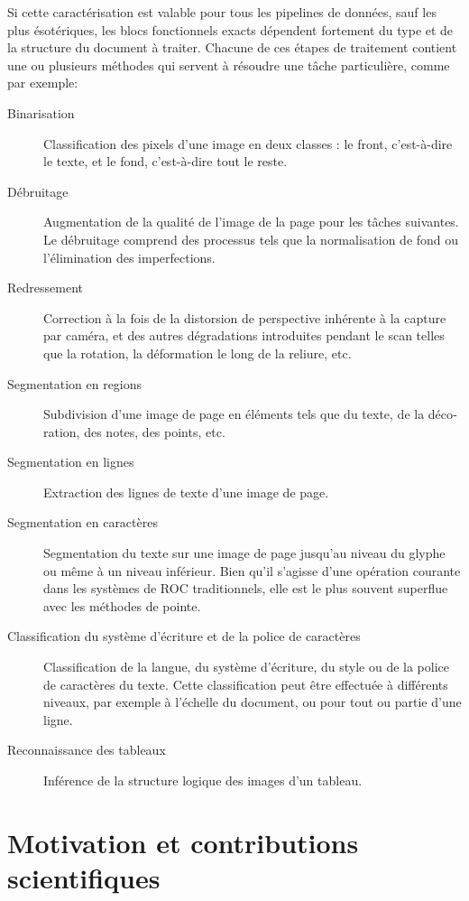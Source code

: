\begin{french}
Si cette caractérisation est valable pour tous les pipelines de données, sauf
les plus ésotériques, les blocs fonctionnels exacts dépendent fortement du type
et de la structure du document à traiter. Chacune de ces étapes de traitement
contient une ou plusieurs méthodes qui servent à résoudre une tâche
particulière, comme par exemple:

\begin{description}
\item [Binarisation] Classification des pixels d'une image en deux classes :
le front, c'est-à-dire le texte, et le fond, c'est-à-dire tout le
reste.
\item [Débruitage] Augmentation de la qualité de l'image de la page pour les tâches
	suivantes. Le débruitage comprend des processus tels que la
		normalisation de fond ou l'élimination des imperfections.
\item [Redressement] Correction à la fois de la distorsion de perspective
	inhérente à la capture par caméra, et des autres dégradations introduites pendant le scan telles que la
rotation, la déformation le long de la reliure, etc.
\item [Segmentation en regions]  Subdivision d'une image de page en éléments tels que du texte, de la décoration, des notes, des points, etc.
\item [Segmentation en lignes] Extraction des lignes de texte d'une image de page.
\item [Segmentation en caractères] Segmentation du texte sur une image de page
	jusqu'au niveau du glyphe ou même à un niveau inférieur. Bien qu'il
		s'agisse d'une opération courante dans les systèmes de ROC
		traditionnels, elle est le plus souvent superflue avec les
		méthodes de pointe.
\item [Classification du système d'écriture et de la police de caractères] Classifi\-ca\-tion de la langue, du système d'écriture, du style ou de la police de
caractères du texte. Cette classification peut être effectuée à
différents niveaux, par exemple à l'échelle du document, ou pour tout ou partie d'une ligne.
\item [Reconnaissance des tableaux] Inférence de la structure logique des images d'un tableau.
\end{description}

\section{Motivation et contributions scientifiques}


\end{french}
